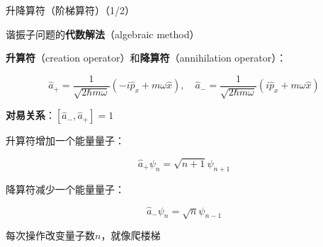 \begin{frame}{升降算符（阶梯算符）（1/2）}
  
  
    \begin{iqbitemize}
    \item 谐振子问题的\textbf{代数解法}（algebraic method）
    \item \textbf{升算符}（creation operator）和\textbf{降算符}（annihilation operator）：
    \end{iqbitemize}
      \[
        \hat{a}_+ = \dfrac{1}{\sqrt{2\hbar m\omega}}(-i\hat{p}_x + m\omega\hat{x}), \quad
        \hat{a}_- = \dfrac{1}{\sqrt{2\hbar m\omega}}(i\hat{p}_x + m\omega\hat{x})
      \]
    \begin{iqbitemize}
    \item \textbf{对易关系}：$[\hat{a}_-, \hat{a}_+] = 1$
    \end{iqbitemize}
    \iqbsmallsep

    \begin{iqbitemize}
    \item 升算符增加一个能量量子：
    \end{iqbitemize}
      \[
        \hat{a}_+\psi_n = \sqrt{n+1}\psi_{n+1}
      \]
    \begin{iqbitemize}
    \item 降算符减少一个能量量子：
    \end{iqbitemize}
      \[
        \hat{a}_-\psi_n = \sqrt{n}\psi_{n-1}
      \]
    \begin{iqbitemize}
    \item 每次操作改变量子数$n$，就像爬楼梯
    \end{iqbitemize}
  
\end{frame}

